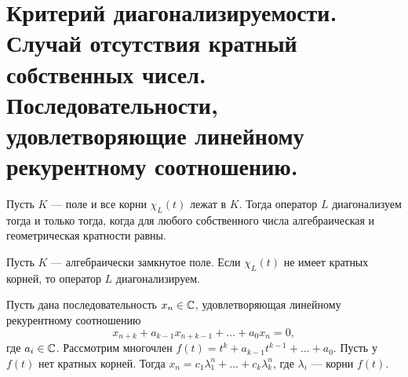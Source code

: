 \section{Критерий диагонализируемости. Случай отсутствия кратный собственных чисел. Последовательности, удовлетворяющие линейному рекурентному соотношению.}
\begin{thm}
    Пусть $ K$ --- поле и все корни $ \chi_L(t)$ лежат в  $ K$. Тогда оператор  $ L$ диагонализуем  тогда и только тогда, когда для любого собственного числа алгебраическая и геометрическая кратности равны.
\end{thm}
\begin{cor}
    Пусть $ K$ --- алгебраически замкнутое поле. Если $ \chi_L(t)$ не имеет кратных корней, то оператор  $ L$ диагонализируем.
\end{cor}
\begin{cor}
    Пусть дана последовательность $ x_{n} \in \mathbb{C}$, удовлетворяющая линейному рекурентному соотношению
    \[
	x_{n+k} + a_{k-1}x_{n+k-1}+ \ldots + a_0x_n = 0
    ,\] 
    где $ a_i \in \mathbb{C}$. Рассмотрим многочлен $ f(t) = t ^{k} + a_{k-1}t^{k-1} + \ldots + a_0$. Пусть у $ f(t)$ нет кратных корней. Тогда   $ x_n = c_1 \lambda _1^{n}+ \ldots + c_k \lambda _k^{n}$, где $ \lambda  _i$ --- корни $ f(t)$.
\end{cor}

